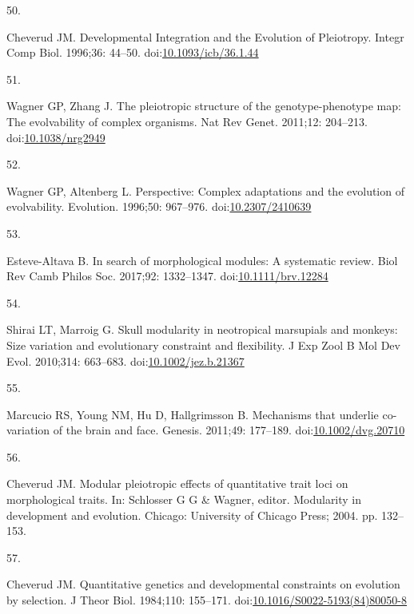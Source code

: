 \documentclass[
]{article}
\newlength{\cslhangindent}
\newlength{\csllabelwidth}
\newenvironment{CSLReferences}[2] %
 {\begin{list}{}{%
  \setlength{\itemindent}{0pt}
  \setlength{\leftmargin}{0pt}
  \setlength{\parsep}{0pt}
  \ifodd #1
   \setlength{\leftmargin}{\cslhangindent}
   \setlength{\itemindent}{-1\cslhangindent}
  \fi
  \setlength{\itemsep}{#2\baselineskip}}}
 {\end{list}}
\newcommand{\CSLLeftMargin}[1]{\parbox[t]{\csllabelwidth}{\strut#1\strut}}
\newcommand{\CSLRightInline}[1]{\parbox[t]{\linewidth - \csllabelwidth}{\strut#1\strut}}
\begin{document}
\begin{CSLReferences}{0}{1}
\CSLLeftMargin{50. }%
\CSLRightInline{Cheverud JM. {Developmental Integration and the
Evolution of Pleiotropy}. Integr Comp Biol. 1996;36: 44--50.
doi:\href{https://doi.org/10.1093/icb/36.1.44}{10.1093/icb/36.1.44}}

\CSLLeftMargin{51. }%
\CSLRightInline{Wagner GP, Zhang J. The pleiotropic structure of the
genotype-phenotype map: The evolvability of complex organisms. Nat Rev
Genet. 2011;12: 204--213.
doi:\href{https://doi.org/10.1038/nrg2949}{10.1038/nrg2949}}

\CSLLeftMargin{52. }%
\CSLRightInline{Wagner GP, Altenberg L. Perspective: Complex adaptations
and the evolution of evolvability. Evolution. 1996;50: 967--976.
doi:\href{https://doi.org/10.2307/2410639}{10.2307/2410639}}

\CSLLeftMargin{53. }%
\CSLRightInline{Esteve-Altava B. In search of morphological modules: A
systematic review. Biol Rev Camb Philos Soc. 2017;92: 1332--1347.
doi:\href{https://doi.org/10.1111/brv.12284}{10.1111/brv.12284}}

\CSLLeftMargin{54. }%
\CSLRightInline{Shirai LT, Marroig G. Skull modularity in neotropical
marsupials and monkeys: Size variation and evolutionary constraint and
flexibility. J Exp Zool B Mol Dev Evol. 2010;314: 663--683.
doi:\href{https://doi.org/10.1002/jez.b.21367}{10.1002/jez.b.21367}}

\CSLLeftMargin{55. }%
\CSLRightInline{Marcucio RS, Young NM, Hu D, Hallgrimsson B. Mechanisms
that underlie co-variation of the brain and face. Genesis. 2011;49:
177--189.
doi:\href{https://doi.org/10.1002/dvg.20710}{10.1002/dvg.20710}}

\CSLLeftMargin{56. }%
\CSLRightInline{Cheverud JM. Modular pleiotropic effects of quantitative
trait loci on morphological traits. In: Schlosser G G \& Wagner, editor.
Modularity in development and evolution. Chicago: University of Chicago
Press; 2004. pp. 132--153. }

\CSLLeftMargin{57. }%
\CSLRightInline{Cheverud JM. {Quantitative genetics and developmental
constraints on evolution by selection.} J Theor Biol. 1984;110:
155--171.
doi:\href{https://doi.org/10.1016/S0022-5193(84)80050-8}{10.1016/S0022-5193(84)80050-8}}


\end{CSLReferences}
\end{document}
